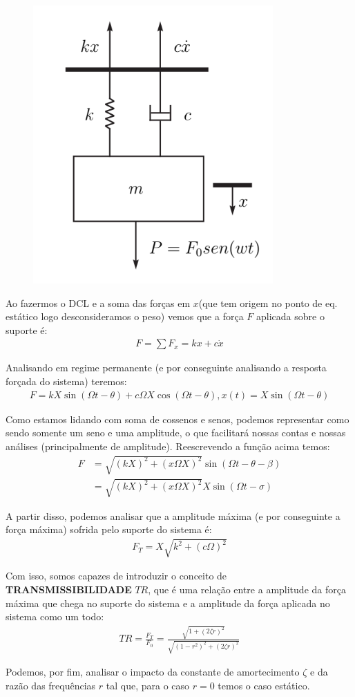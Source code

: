 \documentclass{article}
\newcommand{\n}{\nonumber \\ }
\begin{document}
\begin{figure}[h]
    \centering
    \includegraphics[width=.2\textwidth]{imgs/trans.png}
\end{figure}

Ao fazermos o DCL e  a soma das forças em $x$(que tem origem no ponto de eq. estático logo desconsideramos o peso) vemos que a força $F$ aplicada sobre o suporte é:
\begin{align}
    F = \sum F_x = kx + c\dot x
\end{align}


Analisando em regime permanente (e por conseguinte analisando a resposta forçada do sistema) teremos:
\begin{align}
    F = kX\sin(\Omega t - \theta) + c \Omega X \cos(\Omega t - \theta) ,   x(t) = X\sin(\Omega t -\theta)
\end{align}

Como estamos lidando com soma de cossenos e senos, podemos representar como sendo somente um seno e uma amplitude, o que facilitará nossas contas e nossas análises (principalmente de
amplitude). Reescrevendo a função acima temos:
\begin{align}
    F & = \sqrt{(kX)^2 + (x\Omega X)^2} \sin(\Omega t - \theta - \beta) \n
      & = \sqrt{(kX)^2 + (x\Omega X)^2}  X \sin(\Omega t - \sigma)
\end{align}

A partir disso, podemos analisar que a amplitude máxima (e por conseguinte a força máxima) sofrida pelo suporte do sistema é:
\begin{align}
    F_T = X\sqrt{k^2 + (c \Omega)^2}
\end{align}

Com isso, somos capazes de introduzir o conceito de \textbf{TRANSMISSIBILIDADE} $TR$, que é uma relação entre a amplitude da força máxima que chega no suporte do sistema e a amplitude da força aplicada no sistema
como um todo:
\begin{align}
    TR = \frac{F_T}{F_0} = \frac{\sqrt{1 + (2 \zeta r)^2}}{\sqrt{(1 - r^2)^2 + (2 \zeta r)^2}}
\end{align}

Podemos, por fim, analisar o impacto da constante de amortecimento $\zeta$ e da razão das frequências $r$ tal que, para o caso $r=0$ temos o caso estático.
\end{document}

